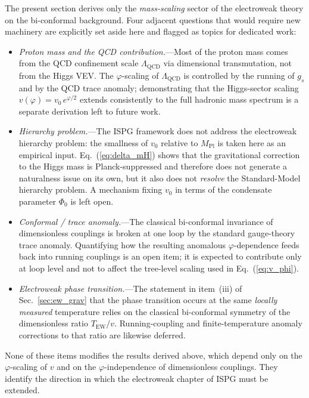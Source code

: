\documentclass[aps,prd,onecolumn,superscriptaddress,nofootinbib,showpacs,12pt,notitlepage]{revtex4-2}
\newcommand{\Mpl}{M_{\mathrm{Pl}}}
\begin{document}
The present section derives only the \emph{mass-scaling}
sector of the electroweak theory on the bi-conformal
background.  Four adjacent questions that would require
new machinery are explicitly set aside here and flagged
as topics for dedicated work:

\begin{itemize}
  \item \emph{Proton mass and the QCD contribution.}---Most
    of the proton mass comes from the QCD confinement
    scale $\Lambda_{\mathrm{QCD}}$ via dimensional
    transmutation, not from the Higgs VEV.  The
    $\varphi$-scaling of $\Lambda_{\mathrm{QCD}}$ is
    controlled by the running of $g_s$ and by the QCD
    trace anomaly; demonstrating that the Higgs-sector
    scaling $v(\varphi) = v_0\,e^{\varphi/2}$ extends
    consistently to the full hadronic mass spectrum is a
    separate derivation left to future work.
  \item \emph{Hierarchy problem.}---The ISPG framework
    does not address the electroweak hierarchy problem:
    the smallness of $v_0$ relative to $\Mpl$ is taken
    here as an empirical input.  Eq.~(\ref{eq:delta_mH})
    shows that the gravitational correction to the Higgs
    mass is Planck-suppressed and therefore does not
    generate a naturalness issue on its own, but it also
    does not \emph{resolve} the Standard-Model hierarchy
    problem.  A mechanism fixing $v_0$ in terms of the
    condensate parameter $\Phi_0$ is left open.
  \item \emph{Conformal / trace anomaly.}---The
    classical bi-conformal invariance of dimensionless
    couplings is broken at one loop by the standard
    gauge-theory trace anomaly.  Quantifying how the
    resulting anomalous $\varphi$-dependence feeds back
    into running couplings is an open item; it is
    expected to contribute only at loop level and not to
    affect the tree-level scaling used in
    Eq.~(\ref{eq:v_phi}).
  \item \emph{Electroweak phase transition.}---The
    statement in item~(iii) of
    Sec.~\ref{sec:ew_grav} that the phase transition
    occurs at the same \emph{locally measured}
    temperature relies on the classical bi-conformal
    symmetry of the dimensionless ratio
    $T_{\mathrm{EW}}/v$.  Running-coupling and
    finite-temperature anomaly corrections to that
    ratio are likewise deferred.
\end{itemize}

None of these items modifies the results derived above,
which depend only on the $\varphi$-scaling of $v$ and on
the $\varphi$-independence of dimensionless couplings.
They identify the direction in which the electroweak
chapter of ISPG must be extended.
\end{document}
